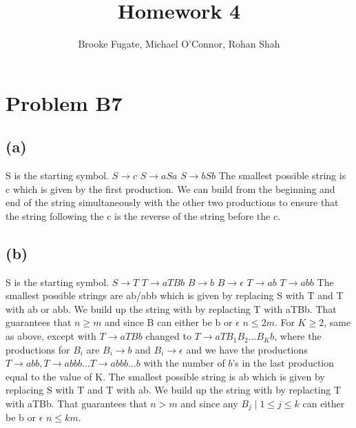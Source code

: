 \documentclass[12pt]{article}
\begin{document}
\pagestyle{plain}
\titleformat{\subsection}[runin]
  {\normalfont\large\bfseries}{\thesubsection}{1em}{}

\title{Homework 4}
\author{Brooke Fugate, Michael O'Connor, Rohan Shah}
\date{}

\maketitle

\section*{Problem B7}
\subsection*{(a)} S is the starting symbol.
\newline
$S \rightarrow c$ \newline
$S \rightarrow aSa$ \newline
$S \rightarrow bSb$ \newline
The smallest possible string is c which is given by the first production.
We can build from the beginning and end of the string simultaneously with the
other two productions to ensure that the string following the c is the reverse
of the string before the c.

\subsection*{(b)} S is the starting symbol.
\newline
$S \rightarrow T$ \newline
$T \rightarrow aTBb$ \newline
$B \rightarrow b$ \newline
$B \rightarrow \epsilon$ \newline
$T \rightarrow ab$ \newline
$T \rightarrow abb$ \newline
The smallest possible strings are ab/abb which is given by replacing S with T
and T with ab or abb. We build up the string with by replacting T with aTBb.
That guarantees that $n \ge m$ and since B can either be b or $\epsilon$
$n \le 2m$. For $K \ge 2$, same as above, except with $T \rightarrow aTBb$
changed to $T \rightarrow aTB_1B_2...B_Kb$, where the productions for $B_i$ are
$B_i \rightarrow b$ and $B_i \rightarrow \epsilon$ and we have the productions
$T \rightarrow abb, T \rightarrow abbb ... T \rightarrow abbb...b$ with the
number of $b$'s in the last production equal to the value of K. The smallest
possible string is ab which is given by replacing S with T and T with ab.
We build up the string with by replacting T with aTBb. That guarantees that
$n > m$ and since any $B_j \mid 1 \le j \le k$ can either be b or
$\epsilon$ $n \le km$.
\end{document}
